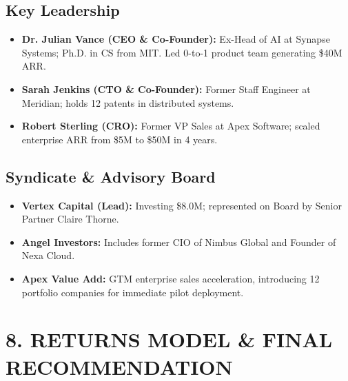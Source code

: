\documentclass[10pt,a4paper]{article}
\begin{document}
\begin{minipage}[t]{0.48\textwidth}
  \subsection*{Key Leadership}
  \begin{itemize}
    \item \textbf{Dr. Julian Vance (CEO \& Co-Founder):} Ex-Head of AI at Synapse Systems; Ph.D. in CS from MIT. Led 0-to-1 product team generating \$40M ARR.
    \item \textbf{Sarah Jenkins (CTO \& Co-Founder):} Former Staff Engineer at Meridian; holds 12 patents in distributed systems.
    \item \textbf{Robert Sterling (CRO):} Former VP Sales at Apex Software; scaled enterprise ARR from \$5M to \$50M in 4 years.
  \end{itemize}
\end{minipage}%
\hfill
\begin{minipage}[t]{0.49\textwidth}
  \subsection*{Syndicate \& Advisory Board}
  \begin{itemize}
    \item \textbf{Vertex Capital (Lead):} Investing \$8.0M; represented on Board by Senior Partner Claire Thorne.
    \item \textbf{Angel Investors:} Includes former CIO of Nimbus Global and Founder of Nexa Cloud.
    \item \textbf{Apex Value Add:} GTM enterprise sales acceleration, introducing 12 portfolio companies for immediate pilot deployment.
  \end{itemize}
\end{minipage}

\vspace{4pt}

\section*{8. RETURNS MODEL \& FINAL RECOMMENDATION}
\end{document}
